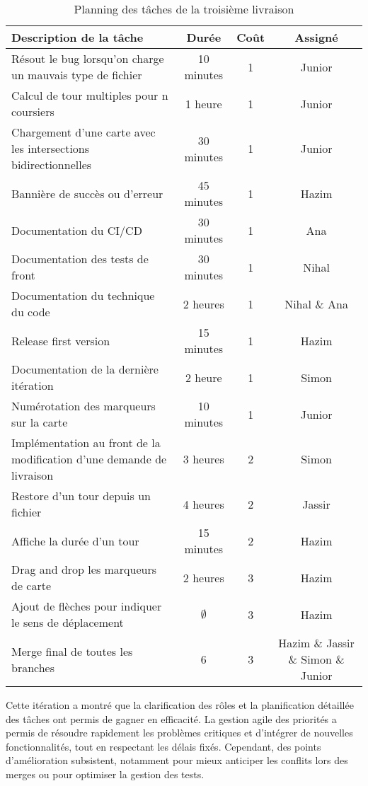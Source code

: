 \documentclass[a4paper]{article}
\begin{document}
\begin{table}[H]
\centering
\begin{tabularx}{\textwidth}{|X|c|c|c|}
\hline
\textbf{Description de la tâche} & \textbf{Durée} & \textbf{Coût} & \textbf{Assigné} \\ \hline
Résout le bug lorsqu'on charge un mauvais type de fichier & 10 minutes & 1 & Junior \\ \hline
Calcul de tour multiples pour n coursiers & 1 heure & 1 & Junior \\ \hline
Chargement d'une carte avec les intersections bidirectionnelles & 30 minutes & 1 & Junior \\ \hline
Bannière de succès ou d'erreur & 45 minutes & 1 & Hazim \\ \hline
Documentation du CI/CD & 30 minutes & 1 & Ana \\ \hline
Documentation des tests de front & 30 minutes & 1 & Nihal \\ \hline
Documentation du technique du code & 2 heures & 1 & Nihal \& Ana \\ \hline
Release first version & 15 minutes & 1 & Hazim \\ \hline
Documentation de la dernière itération & 2 heure & 1 & Simon \\ \hline
Numérotation des marqueurs sur la carte & 10 minutes & 1 & Junior \\ \hline
Implémentation au front de la modification d'une demande de livraison & 3 heures & 2 & Simon \\ \hline
Restore d'un tour depuis un fichier & 4 heures & 2 & Jassir \\ \hline
Affiche la durée d'un tour & 15 minutes & 2 & Hazim \\ \hline
Drag and drop les marqueurs de carte & 2 heures & 3 & Hazim \\ \hline
Ajout de flèches pour indiquer le sens de déplacement & $\emptyset$ & 3 & Hazim \\ \hline
Merge final de toutes les branches & 6 & 3 & Hazim \& Jassir \& Simon \& Junior\\ \hline
\end{tabularx}
\caption{Planning des tâches de la troisième livraison}
\label{tab:planning-taches}
\end{table}

Cette itération a montré que la clarification des rôles et la planification détaillée des tâches ont permis de gagner en efficacité. La gestion agile des priorités a permis de résoudre rapidement les problèmes critiques et d'intégrer de nouvelles fonctionnalités, tout en respectant les délais fixés. Cependant, des points d'amélioration subsistent, notamment pour mieux anticiper les conflits lors des merges ou pour optimiser la gestion des tests. \\
\end{document}
